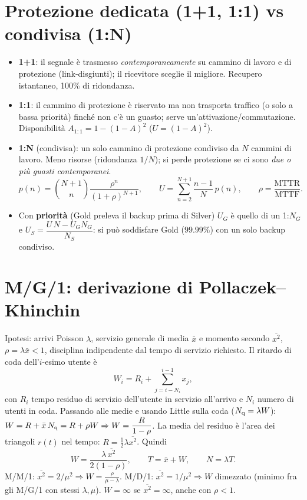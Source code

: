 \section{Protezione dedicata (1+1, 1:1) vs condivisa (1:N)}
\begin{itemize}[nosep]
\item \textbf{1+1}: il segnale è trasmesso \emph{contemporaneamente} su cammino di lavoro e di protezione (link-disgiunti); il ricevitore sceglie il migliore. Recupero istantaneo, 100\% di ridondanza.
\item \textbf{1:1}: il cammino di protezione è riservato ma non trasporta traffico (o solo a bassa priorità) finché non c'è un guasto; serve un'attivazione/commutazione. Disponibilità $A_{1:1}=1-(1-A)^2$ ($U=(1-A)^2$).
\item \textbf{1:N} (condivisa): un solo cammino di protezione condiviso da $N$ cammini di lavoro. Meno risorse (ridondanza $1/N$); si perde protezione se ci sono \emph{due o più guasti contemporanei}.
\begin{equation*}
p(n)=\binom{N+1}{n}\frac{\rho^n}{(1+\rho)^{N+1}},\qquad U=\sum_{n=2}^{N+1}\frac{n-1}{N}\,p(n),\qquad\rho=\frac{\mathrm{MTTR}}{\mathrm{MTTF}}.
\end{equation*}
\item Con \textbf{priorità} (Gold preleva il backup prima di Silver) $U_G$ è quello di un 1:$N_G$ e $U_S=\dfrac{U\,N-U_GN_G}{N_S}$: si può soddisfare Gold ($99.99\%$) con un solo backup condiviso.
\end{itemize}

\section{M/G/1: derivazione di Pollaczek--Khinchin}
Ipotesi: arrivi Poisson $\lambda$, servizio generale di media $\bar x$ e momento secondo $\overline{x^2}$, $\rho=\lambda\bar x<1$, disciplina indipendente dal tempo di servizio richiesto. Il ritardo di coda dell'$i$-esimo utente è
\[
W_i=R_i+\sum_{j=i-N_i}^{i-1}x_j ,
\]
con $R_i$ tempo residuo di servizio dell'utente in servizio all'arrivo e $N_i$ numero di utenti in coda. Passando alle medie e usando Little sulla coda ($N_{\mathrm{q}}=\lambda W$): $W=R+\bar x\,N_{\mathrm{q}}=R+\rho W\Rightarrow W=\dfrac{R}{1-\rho}$. La media del residuo è l'area dei triangoli $r(t)$ nel tempo: $R=\tfrac12\lambda\overline{x^2}$. Quindi
\[
W=\frac{\lambda\,\overline{x^2}}{2(1-\rho)},\qquad T=\bar x+W,\qquad N=\lambda T .
\]
M/M/1: $\overline{x^2}=2/\mu^2\Rightarrow W=\frac{\rho}{\mu-\lambda}$. M/D/1: $\overline{x^2}=1/\mu^2\Rightarrow W$ dimezzato (minimo fra gli M/G/1 con stessi $\lambda,\mu$). $W=\infty$ se $\overline{x^2}=\infty$, anche con $\rho<1$.
